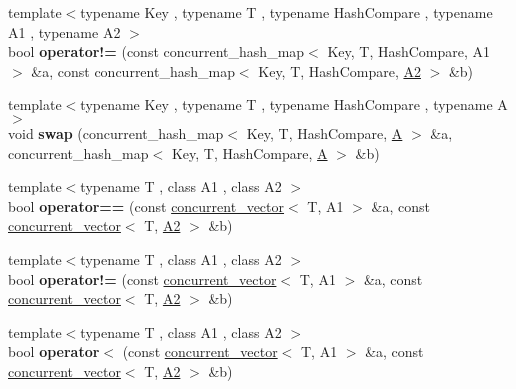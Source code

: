 \begin{DoxyCompactItemize}
\item 
\hypertarget{namespacetbb_a05667bcb12f763124fcda402d3720c6a}{}{\footnotesize template$<$typename Key , typename T , typename Hash\+Compare , typename A1 , typename A2 $>$ }\\bool {\bfseries operator!=} (const concurrent\+\_\+hash\+\_\+map$<$ Key, T, Hash\+Compare, A1 $>$ \&a, const concurrent\+\_\+hash\+\_\+map$<$ Key, T, Hash\+Compare, \hyperlink{classA2}{A2} $>$ \&b)\label{namespacetbb_a05667bcb12f763124fcda402d3720c6a}

\item 
\hypertarget{namespacetbb_a16dc40ac2badc8b36b8cc70f92801b76}{}{\footnotesize template$<$typename Key , typename T , typename Hash\+Compare , typename A $>$ }\\void {\bfseries swap} (concurrent\+\_\+hash\+\_\+map$<$ Key, T, Hash\+Compare, \hyperlink{structA}{A} $>$ \&a, concurrent\+\_\+hash\+\_\+map$<$ Key, T, Hash\+Compare, \hyperlink{structA}{A} $>$ \&b)\label{namespacetbb_a16dc40ac2badc8b36b8cc70f92801b76}

\item 
\hypertarget{namespacetbb_a79ecee2d23f2486c03e720ab9e3ac36c}{}{\footnotesize template$<$typename T , class A1 , class A2 $>$ }\\bool {\bfseries operator==} (const \hyperlink{classtbb_1_1concurrent__vector}{concurrent\+\_\+vector}$<$ T, A1 $>$ \&a, const \hyperlink{classtbb_1_1concurrent__vector}{concurrent\+\_\+vector}$<$ T, \hyperlink{classA2}{A2} $>$ \&b)\label{namespacetbb_a79ecee2d23f2486c03e720ab9e3ac36c}

\item 
\hypertarget{namespacetbb_ab7258c4acabadf94d03dc62e29396ea0}{}{\footnotesize template$<$typename T , class A1 , class A2 $>$ }\\bool {\bfseries operator!=} (const \hyperlink{classtbb_1_1concurrent__vector}{concurrent\+\_\+vector}$<$ T, A1 $>$ \&a, const \hyperlink{classtbb_1_1concurrent__vector}{concurrent\+\_\+vector}$<$ T, \hyperlink{classA2}{A2} $>$ \&b)\label{namespacetbb_ab7258c4acabadf94d03dc62e29396ea0}

\item 
\hypertarget{namespacetbb_a1523d0389a8cbda80c17ae4f45caa3a6}{}{\footnotesize template$<$typename T , class A1 , class A2 $>$ }\\bool {\bfseries operator$<$} (const \hyperlink{classtbb_1_1concurrent__vector}{concurrent\+\_\+vector}$<$ T, A1 $>$ \&a, const \hyperlink{classtbb_1_1concurrent__vector}{concurrent\+\_\+vector}$<$ T, \hyperlink{classA2}{A2} $>$ \&b)\label{namespacetbb_a1523d0389a8cbda80c17ae4f45caa3a6}


\end{DoxyCompactItemize}
